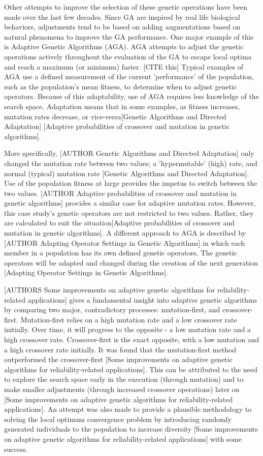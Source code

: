 \documentclass{sig-alternate}
\begin{document}
Other attempts to improve the selection of these genetic operations have been made over the last few decades. Since GA are inspired by real life biological behaviors, adjustments tend to be based on adding augmentations based on natural phenomena to improve the GA performance. One major example of this is Adaptive Genetic Algorithms (AGA). AGA attempts to adjust the genetic operations actively throughout the evaluation of the GA to escape local optima and reach a maximum (or minimum) faster. [CITE this] Typical examples of AGA use a defined measurement of the current 'performance' of the population, such as the population's mean fitness, to determine when to adjust genetic operators. Because of this adaptability, use of AGA requires less knowledge of the search space. Adaptation means that in some examples, as fitness increases, mutation rates decrease, or vice-versa[Genetic Algorithms and Directed Adaptation] [Adaptive probabilities of crossover and mutation in genetic algorithms]. 

More specifically, [AUTHOR Genetic Algorithms and Directed Adaptation] only changed the mutation rate between two values; a 'hypermutable' (high) rate, and normal (typical) mutation rate [Genetic Algorithms and Directed Adaptation]. Use of the population fitness at large provides the impetus to switch between the two values. [AUTHOR Adaptive probabilities of crossover and mutation in genetic algorithms] provides a similar case for adaptive mutation rates. However, this case study's genetic operators are not restricted to two values. Rather, they are calculated to suit the situation[Adaptive probabilities of crossover and mutation in genetic algorithms]. A different approach to AGA is described by [AUTHOR Adapting Operator Settings in Genetic Algorithms] in which each member in a population has its own defined genetic operators. The genetic operators will be adapted and changed during the creation of the next generation [Adapting Operator Settings in Genetic Algorithms].

[AUTHORS Some improvements on adaptive genetic algorithms for reliability-related applications] gives a fundamental insight into adaptive genetic algorithms by comparing two major, contradictory processes: mutation-first, and crossover-first. Mutation-first relies on a high mutation rate and a low crossover rate initially. Over time, it will progress to the opposite - a low mutation rate and a high crossover rate. Crossover-first is the exact opposite, with a low mutation and a high crossover rate initially. It was found that the mutation-first method outperformed the crossover-first [Some improvements on adaptive genetic algorithms for reliability-related applications]. This can be attributed to the need to explore the search space early in the execution (through mutation) and to make smaller adjustments (through increased crossover operations) later on [Some improvements on adaptive genetic algorithms for reliability-related applications]. An attempt was also made to provide a plausible methodology to solving the local optimum convergence problem by introducing randomly generated individuals to the population to increase diversity [Some improvements on adaptive genetic algorithms for reliability-related applications] with some success.
\end{document}
